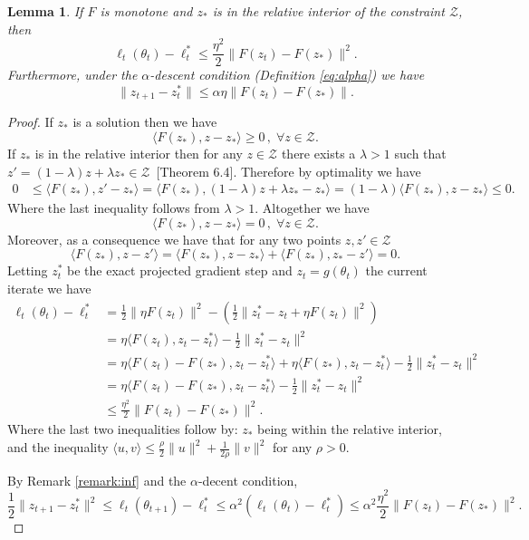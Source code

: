 \documentclass{article} %
\newtheorem{lemma}[theorem]{Lemma}
\theoremstyle{definition}
\newcommand{\inner}[2]{\langle #1, #2 \rangle}
\begin{document}
\begin{lemma}\label{thm:bias}
    If $F$ is monotone and $z_\ast$ is in the relative interior of the constraint $\mathcal{Z}$, then 
    \[
        \ell_t(\theta_t) - \ell_t^\ast \leq \frac{\eta^2 }{2}\|F(z_t)-F(z_\ast)\|^2.
    \]
    Furthermore, under the $\alpha$-descent condition (Definition \ref{eq:alpha}) we have
    \[
    \|z_{t+1}-z_t^\ast\| \leq \alpha \eta \|F(z_t)-F(z_\ast)\|.
    \]
\end{lemma}
\begin{proof}
    If $z_\ast$ is a solution then we have
    \[
        \inner{F(z_\ast)}{z-z_\ast} \geq 0\,,\; \forall z \in \mathcal{Z}.
    \]
    If $z_\ast$ is in the relative interior then for any $z \in \mathcal{Z}$ there exists a $\lambda > 1$ such that $z' = (1-\lambda)z +\lambda z_\ast  \in \mathcal{Z}$~\citep{rockafellar1997convex}[Theorem 6.4].
    Therefore by optimality we have
    \begin{align*}      
       0 &\leq \inner{F(z_\ast)}{z'-z_\ast} 
       =\inner{F(z_\ast)}{ (1-\lambda)z +\lambda z_\ast-z_\ast} 
        =(1-\lambda)\inner{F(z_\ast)}{z-z_\ast} \leq 0.   
    \end{align*}
    Where the last inequality follows from $\lambda > 1$. Altogether we have 
    \[
        \inner{F(z_\ast)}{z-z_\ast} = 0 \,,\;\forall z \in \mathcal{Z}.
    \]
    Moreover, as a consequence we have that for any two points $z, z' \in \mathcal{Z}$
    \[
        \inner{F(z_\ast)}{z-z'} = \inner{F(z_\ast)}{z-z_\ast} + \inner{F(z_\ast)}{z_\ast-z'} = 0.
    \]
    Letting $z_t^\ast$ be the exact projected gradient step and $z_t =g(\theta_t)$ the current iterate  we have
    \begin{align*}
        \ell_t(\theta_t) - \ell_t^\ast &= \frac{1}{2}\|\eta F(z_t)\|^2 - \left(\frac{1}{2}\|z_t^\ast -z_t + \eta F(z_t)\|^2 \right)\\
        &=\eta \inner{F(z_t)}{z_t-z_t^\ast}  -\frac{1}{2}\|z_t^\ast-z_t\|^2\\
        &= \eta \inner{F(z_t) - F(z_\ast)}{z_t-z_t^\ast} + \eta \inner{F(z_\ast)}{z_t-z_t^\ast}  -\frac{1}{2}\|z_t^\ast-z_t\|^2\\
        &= \eta \inner{F(z_t) - F(z_\ast)}{z_t-z_t^\ast} -\frac{1}{2}\|z_t^\ast-z_t\|^2\\
        &\leq \frac{\eta^2 }{2}\|F(z_t)-F(z_\ast)\|^2.
    \end{align*}
    Where the last two inequalities follow by: $z_\ast$ being within the relative interior, and the inequality $\inner{u}{v} \leq \frac{\rho}{2}\|u\|^2 +\frac{1}{2\rho}\|v\|^2$ for any $\rho > 0$.

    By Remark \ref{remark:inf} and the $\alpha$-decent condition,
    \[
        \frac{1}{2}\|z_{t+1}-z_t^\ast\|^2 \leq \ell_t(\theta_{t+1})-\ell_t^\ast \leq \alpha^2 (\ell_t(\theta_t) -\ell_t^\ast) \leq \alpha^2\frac{\eta^2}{2}\|F(z_t)-F(z_\ast)\|^2.
    \] 
\end{proof}
\end{document}
